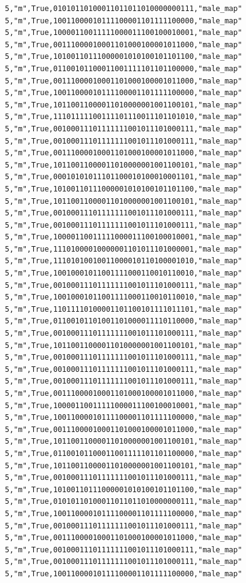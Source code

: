 \documentclass[authoryearcitations]{UoYCSproject}
\begin{document}
\begin{framed}
\begin{verbatim}
5,"m",True,01010110100011011011010000000111,"male_map"
5,"m",True,10011000010111100001101111100000,"male_map"
5,"m",True,10000110011111000011100100010001,"male_map"
5,"m",True,00111000010001101000100001011000,"male_map"
5,"m",True,10100110111000001010100101101100,"male_map"
5,"m",True,01100101100011001111101101100000,"male_map"
5,"m",True,00111000010001101000100001011000,"male_map"
5,"m",True,10011000010111100001101111100000,"male_map"
5,"m",True,10110011000011010000001001100101,"male_map"
5,"m",True,11101111100111101110011101101010,"male_map"
5,"m",True,00100011101111111001011101000111,"male_map"
5,"m",True,00100011101111111001011101000111,"male_map"
5,"m",True,00111000010001101000100001011000,"male_map"
5,"m",True,10110011000011010000001001100101,"male_map"
5,"m",True,00010101011101100010100010001101,"male_map"
5,"m",True,10100110111000001010100101101100,"male_map"
5,"m",True,10110011000011010000001001100101,"male_map"
5,"m",True,00100011101111111001011101000111,"male_map"
5,"m",True,00100011101111111001011101000111,"male_map"
5,"m",True,10000110011111000011100100010001,"male_map"
5,"m",True,11101000010000001101011101000001,"male_map"
5,"m",True,11101010010011000010110100001010,"male_map"
5,"m",True,10010001011001111000110010110010,"male_map"
5,"m",True,00100011101111111001011101000111,"male_map"
5,"m",True,10010001011001111000110010110010,"male_map"
5,"m",True,11011110100001101100101111011101,"male_map"
5,"m",True,01100101101001101000011110110000,"male_map"
5,"m",True,00100011101111111001011101000111,"male_map"
5,"m",True,10110011000011010000001001100101,"male_map"
5,"m",True,00100011101111111001011101000111,"male_map"
5,"m",True,00100011101111111001011101000111,"male_map"
5,"m",True,00100011101111111001011101000111,"male_map"
5,"m",True,00111000010001101000100001011000,"male_map"
5,"m",True,10000110011111000011100100010001,"male_map"
5,"m",True,10011000010111100001101111100000,"male_map"
5,"m",True,00111000010001101000100001011000,"male_map"
5,"m",True,10110011000011010000001001100101,"male_map"
5,"m",True,01100101100011001111101101100000,"male_map"
5,"m",True,10110011000011010000001001100101,"male_map"
5,"m",True,00100011101111111001011101000111,"male_map"
5,"m",True,10100110111000001010100101101100,"male_map"
5,"m",True,01010110100011011011010000000111,"male_map"
5,"m",True,10011000010111100001101111100000,"male_map"
5,"m",True,00100011101111111001011101000111,"male_map"
5,"m",True,00111000010001101000100001011000,"male_map"
5,"m",True,00100011101111111001011101000111,"male_map"
5,"m",True,00100011101111111001011101000111,"male_map"
5,"m",True,10011000010111100001101111100000,"male_map"

\end{verbatim}
\end{framed}
\end{document}
